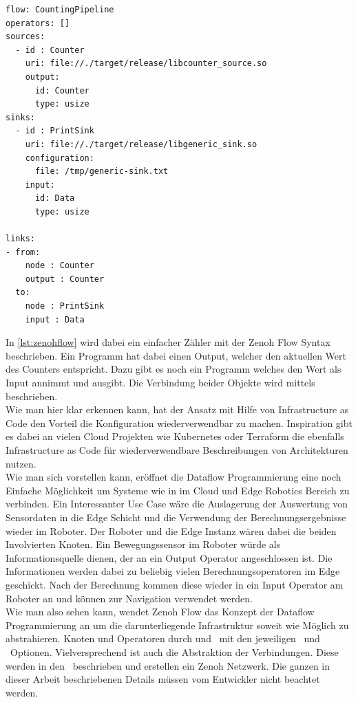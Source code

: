 \begin{lstlisting}[caption={Beispiel einer YAML Datei für die Konfiguration von Zenoh Flow \cite{EclipseZenohFlowExamples2022}.}, label={lst:zenohflow}, captionpos=b]
flow: CountingPipeline
operators: []
sources:
  - id : Counter
    uri: file://./target/release/libcounter_source.so
    output:
      id: Counter
      type: usize
sinks:
  - id : PrintSink
    uri: file://./target/release/libgeneric_sink.so
    configuration:
      file: /tmp/generic-sink.txt
    input:
      id: Data
      type: usize

links:
- from:
    node : Counter
    output : Counter
  to:
    node : PrintSink
    input : Data
\end{lstlisting}

In \autoref{lst:zenohflow} wird dabei ein einfacher Zähler mit der Zenoh Flow Syntax beschrieben. Ein  Programm hat dabei einen Output, welcher den aktuellen Wert des Counters entspricht. Dazu gibt es noch ein  Programm welches den Wert als Input annimmt und ausgibt. Die Verbindung beider Objekte wird mittels  beschrieben.\\
Wie man hier klar erkennen kann, hat der Ansatz mit Hilfe von Infrastructure as Code den Vorteil die Konfiguration wiederverwendbar zu machen. Inspiration gibt es dabei an vielen Cloud Projekten wie Kubernetes oder Terraform die ebenfalls Infrastructure as Code für wiederverwendbare Beschreibungen von Architekturen nutzen.\\

Wie man sich vorstellen kann, eröffnet die Dataflow Programmierung eine noch Einfache Möglichkeit um Systeme wie in im Cloud und Edge Robotics Bereich zu verbinden. Ein Interessanter Use Case wäre die Auslagerung der Auswertung von Sensordaten in die Edge Schicht und die Verwendung der Berechnungsergebnisse wieder im Roboter. Der Roboter und die Edge Instanz wären dabei die beiden Involvierten Knoten. Ein Bewegungssensor im Roboter würde als Informationsquelle dienen, der an ein Output Operator angeschlossen ist. Die Informationen werden dabei zu beliebig vielen Berechnungsoperatoren im Edge geschickt. Nach der Berechnung kommen diese wieder in ein Input Operator am Roboter an und können zur Navigation verwendet werden.\\
Wie man also sehen kann, wendet Zenoh Flow das Konzept der Dataflow Programmierung an um die darunterliegende Infrastruktur soweit wie Möglich zu abstrahieren. Knoten und Operatoren durch  und  mit den jeweiligen  und  Optionen. Vielversprechend ist auch die Abstraktion der Verbindungen. Diese werden in den  beschrieben und erstellen ein Zenoh Netzwerk. Die ganzen in dieser Arbeit beschriebenen Details müssen vom Entwickler nicht beachtet werden.

